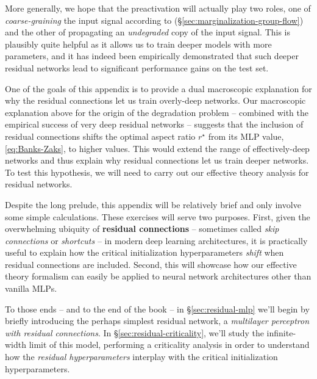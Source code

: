 More generally, we hope that the preactivation will actually play two roles,  one of \emph{coarse-graining} the input signal according to  (\S\ref{sec:marginalization-group-flow}) and the other of propagating an \emph{undegraded} copy of the input signal. This is plausibly quite helpful as it allows us to train deeper models with more parameters, and it has indeed been empirically demonstrated that such deeper residual networks lead to significant performance gains on the test set.







One of the goals of this appendix is to provide a dual macroscopic explanation for why the residual connections let us train overly-deep networks. Our macroscopic explanation above for the origin of the degradation problem  -- combined with the empirical success of very deep residual networks -- suggests that the inclusion of residual connections shifts the optimal aspect ratio $r^\star$ from its MLP value, \eqref{eq:Banks-Zaks}, to higher values. This would extend the range of effectively-deep networks and thus explain why residual connections let us train deeper networks.
To test this hypothesis, we will need to 
carry out our
effective theory analysis for residual networks.


Despite the long prelude, this appendix will be relatively brief and only involve some simple calculations.
These 
exercises will serve two purposes.
First, given the overwhelming ubiquity of \textbf{residual connections} -- sometimes called \emph{skip connections} or \emph{shortcuts} -- in modern deep learning architectures, it is practically useful to explain how the critical initialization hyperparameters \emph{shift} when residual connections are included.
Second, this will showcase how our effective theory formalism can easily be applied to neural network architectures other than vanilla MLPs.



To those ends -- and to the end of the book -- in \S\ref{sec:residual-mlp} we'll begin by briefly introducing the perhaps simplest residual network, a \emph{multilayer perceptron with residual connections}. In \S\ref{sec:residual-criticality}, we'll study the infinite-width limit of this model,
performing a criticality analysis 
in order to understand how the \emph{residual hyperparameters} 
interplay with 
the critical initialization hyperparameters. 

